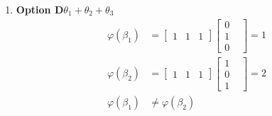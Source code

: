 \documentclass{article}
\begin{document}
\begin{enumerate}
\item \textbf{Option D}\quad $\theta_1 + \theta_2 + \theta_3$\\
\begin{align*}
    \varphi(\beta_1) &= \begin{bmatrix} 1& 1& 1 \end{bmatrix} \begin{bmatrix} 0&\\ 1&\\ 0& \end{bmatrix} = 1\\
    \varphi(\beta_2) &= \begin{bmatrix} 1& 1& 1 \end{bmatrix} \begin{bmatrix} 1&\\ 0&\\ 1& \end{bmatrix} = 2\\
    \varphi(\beta_1) &\neq \varphi(\beta_2)
\end{align*}


\end{enumerate}
\end{document}
